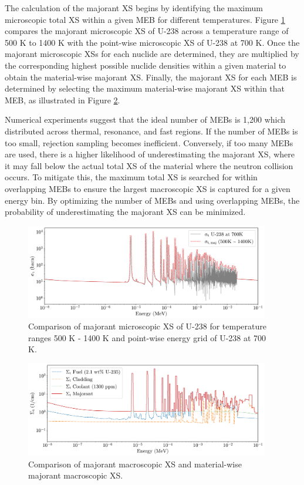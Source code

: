 The calculation of the majorant XS begins by identifying the maximum microscopic total XS within a given MEB for different temperatures. Figure \ref{fig_2} compares the majorant microscopic XS of U-238 across a temperature range of 500 K to 1400 K with the point-wise microscopic XS of U-238 at 700 K. Once the majorant microscopic XSs for each nuclide are determined, they are multiplied by the corresponding highest possible nuclide densities within a given material to obtain the material-wise majorant XS. Finally, the majorant XS for each MEB is determined by selecting the maximum material-wise majorant XS within that MEB, as illustrated in Figure \ref{fig_3}.

Numerical experiments suggest that the ideal number of MEBs is 1,200 which distributed across thermal, resonance, and fast regions. If the number of MEBs is too small, rejection sampling becomes inefficient. Conversely, if too many MEBs are used, there is a higher likelihood of underestimating the majorant XS, where it may fall below the actual total XS of the material where the neutron collision occurs. To mitigate this, the maximum total XS is searched for within overlapping MEBs to ensure the largest macroscopic XS is captured for a given energy bin. By optimizing the number of MEBs and using overlapping MEBs, the probability of underestimating the majorant XS can be minimized.

\begin{figure}
    \centering
    \includegraphics[width=0.95\textwidth]{figs/maj.pdf}
    \caption[Comparison of majorant microscopic XS of U-238]{Comparison of majorant microscopic XS of U-238 for temperature ranges 500 K - 1400 K and point-wise energy grid of U-238 at 700 K.}
    \label{fig_2}
\end{figure}
\begin{figure}
    \centering
    \includegraphics[width=0.95\textwidth]{figs/maj_mat.pdf}
    \caption[Comparison of majorant macroscopic XS]{Comparison of majorant macroscopic XS and material-wise majorant macroscopic XS.}
    \label{fig_3}
\end{figure}

